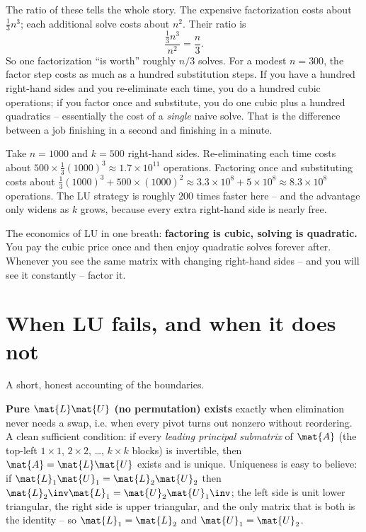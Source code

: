 The ratio of these tells the whole story. The expensive factorization costs about
$\tfrac13 n^3$; each additional solve costs about $n^2$. Their ratio is
\[
  \frac{\tfrac13 n^3}{n^2} = \frac{n}{3}.
\]
So one factorization ``is worth'' roughly $n/3$ solves. For a modest $n=300$, the factor
step costs as much as a hundred substitution steps. If you have a hundred right-hand sides
and you re-eliminate each time, you do a hundred cubic operations; if you factor once and
substitute, you do one cubic plus a hundred quadratics -- essentially the cost of a
\emph{single} naive solve. That is the difference between a job finishing in a second and
finishing in a minute.

\begin{example}
\label{ch09:ex-count}
Take $n=1000$ and $k=500$ right-hand sides. Re-eliminating each time costs about
$500 \times \tfrac13(1000)^3 \approx 1.7\times 10^{11}$ operations. Factoring once and
substituting costs about $\tfrac13(1000)^3 + 500\times(1000)^2 \approx 3.3\times 10^8 +
5\times 10^8 \approx 8.3\times 10^8$ operations. The LU strategy is roughly $200$ times
faster here -- and the advantage only widens as $k$ grows, because every extra right-hand
side is nearly free.
\end{example}

\begin{focusbox}
The economics of LU in one breath: \textbf{factoring is cubic, solving is quadratic.} You
pay the cubic price once and then enjoy quadratic solves forever after. Whenever you see the
same matrix with changing right-hand sides -- and you will see it constantly -- factor it.
\end{focusbox}

\section{When LU fails, and when it does not}
\label{ch09:existence}

A short, honest accounting of the boundaries.

\textbf{Pure $\mat{L}\mat{U}$ (no permutation) exists} exactly when elimination never needs a
swap, i.e. when every pivot turns out nonzero without reordering. A clean sufficient
condition: if every \emph{leading principal submatrix} of $\mat{A}$ (the top-left
$1\times 1$, $2\times 2$, \dots, $k\times k$ blocks) is invertible, then $\mat{A}=\mat{L}\mat{U}$
exists and is unique. Uniqueness is easy to believe: if $\mat{L}_1\mat{U}_1=\mat{L}_2\mat{U}_2$
then $\mat{L}_2\inv\mat{L}_1=\mat{U}_2\mat{U}_1\inv$; the left side is unit lower triangular,
the right side is upper triangular, and the only matrix that is both is the identity -- so
$\mat{L}_1=\mat{L}_2$ and $\mat{U}_1=\mat{U}_2$.

